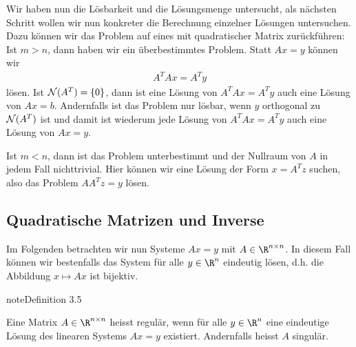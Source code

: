 \documentclass[letterpaper,10pt,english]{jupyterBook}
\begin{document}
Wir haben nun die Lösbarkeit und die Lösungsmenge untersucht, als nächsten Schritt wollen wir nun konkreter die Berechnung einzelner Lösungen untersuchen. Dazu können wir das Problem auf eines mit quadratischer Matrix zurückführen: Ist \(m > n\), dann haben wir ein überbestimmtes Problem. Statt \(Ax = y\) können wir
\begin{equation*}
\begin{split}A^TA x = A^T y\end{split}
\end{equation*}
lösen. Ist \({\cal N}(A^T) =\{0\}\), dann ist eine Lösung von \(A^T A x=A^Ty\) auch eine Lösung von \(Ax =b\). Andernfalls ist das Problem nur lösbar, wenn \(y\) orthogonal zu \({\cal N}(A^T)\) ist und damit ist wiederum jede Lösung von \(A^T A x=A^Ty\) auch eine Lösung von \(Ax =y\).

Ist \(m < n\), dann ist das Problem unterbestimmt und der Nullraum von \(A\) in jedem Fall nichttrivial. Hier können wir eine Lösung der Form \(x=A^T z\) suchen, also das Problem \(AA^T z = y\) lösen.


\subsection{Quadratische Matrizen und Inverse}
\label{\detokenize{vektorraeume/LGS:quadratische-matrizen-und-inverse}}
Im Folgenden betrachten wir nun Systeme \(Ax = y\) mit \(A \in \R^{n \times n}\). In diesem Fall können wir bestenfalls das System für alle \(y \in \R^n\) eindeutig lösen, d.h. die Abbildung \(x \mapsto Ax\) ist bijektiv.
\label{vektorraeume/LGS:definition-8}
\begin{sphinxadmonition}{note}{Definition 3.5}



Eine Matrix \(A \in \R^{n \times n}\) heisst regulär, wenn für alle \(y \in \R^n\) eine eindeutige Lösung des linearen Systems \(Ax=y\) existiert. Andernfalls heisst \(A\) singulär.
\end{sphinxadmonition}
\end{document}
